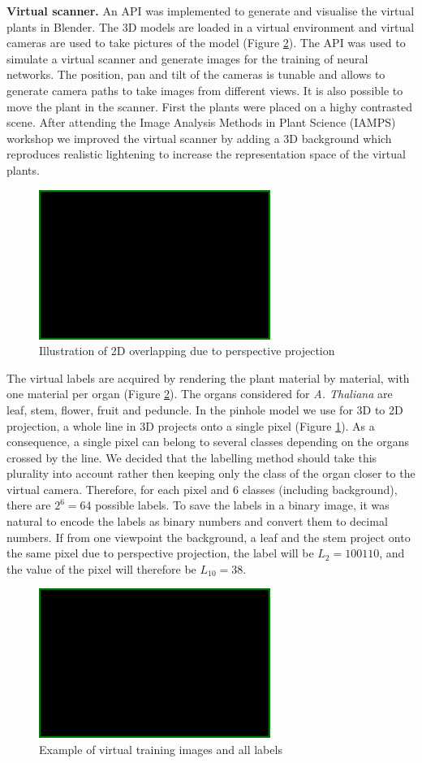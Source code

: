 \textbf{Virtual scanner.} An API was implemented to generate and visualise the virtual plants in Blender. The 3D models are loaded in a virtual environment and virtual cameras are used to take pictures of the model (Figure \ref{fig:plants}). The API was used to simulate a virtual scanner and generate images for the training of neural networks. The position, pan and tilt of the cameras is tunable and allows to generate camera paths to take images from different views. It is also possible to move the plant in the scanner. First the plants were placed on a highy contrasted scene. After attending the Image Analysis Methods in Plant Science (IAMPS) workshop we improved the virtual scanner by adding a 3D background \cite{} which reproduces realistic lightening to increase the representation space of the virtual plants.


\begin{figure}[h]
	\centering
	\includegraphics[width=0.1\linewidth]{figures/blank.png}
	\caption{Illustration of 2D overlapping due to perspective projection }
	\label{fig:pinhole}
\end{figure}

The virtual labels are acquired by rendering the plant material by material, with one material per organ (Figure \ref{fig:plants}). The organs considered for \textit{A. Thaliana} are leaf, stem, flower, fruit and peduncle. In the pinhole model \cite{} we use for 3D to 2D projection, a whole line in 3D projects onto a single pixel (Figure \ref{fig:pinhole}). As a consequence, a single pixel can belong to several classes depending on the organs crossed by the line. We decided that the labelling method should take this plurality into account rather then keeping only the class of the organ closer to the virtual camera. Therefore, for each pixel and 6 classes (including background), there are $2^6 = 64$ possible labels. To save the labels in a binary image, it was natural to encode the labels as binary numbers and convert them to decimal numbers. If from one viewpoint the background, a leaf and the stem project onto the same pixel due to perspective projection, the label will be $L_2 = 100110$, and the value of the pixel will therefore be $L_{10} = 38$.\\

\begin{figure}[h]
	\centering
	\includegraphics[width=0.1\linewidth]{figures/blank.png}
	\caption{Example of virtual training images and all labels}
	\label{fig:plants}
\end{figure}